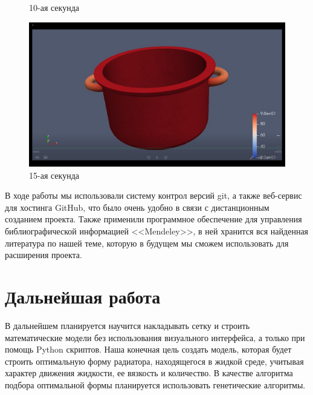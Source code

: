 \documentclass[a4paper,12pt]{article}
\theoremstyle{plain} %
\theoremstyle{definition} %
\theoremstyle{remark} %
\begin{document}
\begin{figure}[h]
\begin{center}
\begin{minipage}[h]{0.4\linewidth}
				\caption{10-ая секунда} %
			\end{minipage}
			\hfill
			\begin{minipage}[h]{0.4\linewidth}
				\includegraphics[width=1\linewidth]{4s}
				\caption{15-ая секунда}
			\end{minipage}
		\end{center}
	\end{figure}

В ходе работы мы использовали систему контрол версий git, а также веб-сервис для хостинга GitHub, что было очень удобно в связи с дистанционным созданием проекта. Также применили программное обеспечение для управления библиографической информацией <<Mendeley>>, в ней хранится вся найденная литература по нашей теме, которую в будущем мы сможем использовать для расширения проекта.
\newpage

\section{Дальнейшая работа}
В дальнейшем планируется научится накладывать сетку и строить математические модели без использования визуального интерфейса, а только при помощь Python скриптов. Наша конечная цель создать модель, которая будет строить оптимальную форму радиатора, находящегося в жидкой среде, учитывая характер движения жидкости, ее вязкость и количество. В качестве алгоритма подбора оптимальной формы планируется использовать генетические алгоритмы.


	\newpage
	
	
\end{document}
